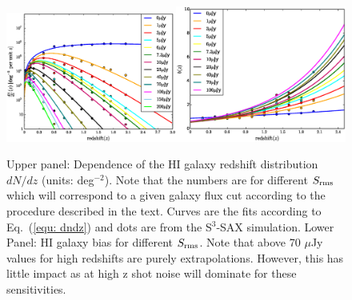 \documentclass[useAMS,usenatbib]{mn2e}
\begin{document}
\begin{figure}
\begin{center}
\includegraphics[width=0.5\textwidth]{plots/fittingMario_dNOverdz_using_ObreschkowFunc_diff_14bins_3.eps}\includegraphics[width=0.5\textwidth]{plots/fitted_bias.eps}
\caption{Upper panel: Dependence of the HI galaxy redshift distribution $dN/dz$ (units: deg$^{-2}$). Note that the numbers are for different $S_{\rm{rms}}$ which will correspond to a given galaxy flux cut according to the procedure described in the text. Curves are the fits according to Eq.~(\ref{equ: dndz}) and dots are from the S$^3$-SAX simulation. Lower Panel: HI galaxy bias for different $S_{\rm{rms}}$. Note that above 70 $\mu$Jy values for high redshifts are purely extrapolations. However, this has little impact as at high z shot noise will dominate for these sensitivities.} 
\label{fig:dNOverdz_fit_sax3}
\end{center}
\end{figure}
\end{document}
